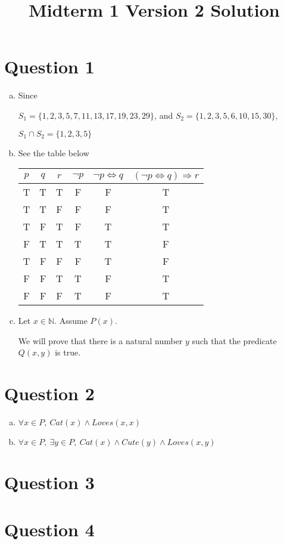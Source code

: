\documentclass[12pt]{article}
\begin{document}
\title{Midterm 1 Version 2 Solution}
\maketitle

\section*{Question 1}
\begin{enumerate}[a.]
    \item

    Since

    $S_1 = \{1,2,3,5,7,11,13,17,19,23,29\}$, and $S_2 = \{1,2,3,5,6,10,15,30\}$,

    $S_1 \cap S_2 = \{1,2,3,5\}$

    \item

    See the table below

    \begin{tabular}{c|c|c|c|c|c}
        $p$ & $q$ & $r$ & $\neg p$ & $\neg p \Leftrightarrow q$ & $(\neg p \Leftrightarrow q) \Rightarrow r$\\
        \hline
        T & T & T & F & F & T\\
        \hline
        T & T & F & F & F & T\\
        \hline
        T & F & T & F & T & T\\
        \hline
        F & T & T & T & T & F\\
        \hline
        T & F & F & F & T & F\\
        \hline
        F & F & T & T & F & T\\
        \hline
        F & F & F & T & F & T
    \end{tabular}

    \item

    Let $x \in \mathbb{N}$. Assume $P(x)$.

    \bigskip

    We will prove that there is a natural number $y$ such that the predicate
    $Q(x,y)$ is true.

\end{enumerate}

\section*{Question 2}
\begin{enumerate}[a.]
    \item

    $\forall x \in P,\:Cat(x) \land Loves(x,x)$

    \item

    $\forall x \in P,\: \exists y \in P,\: Cat(x) \land Cute(y) \land Loves(x,y)$
\end{enumerate}

\section*{Question 3}

\section*{Question 4}
\end{document}
